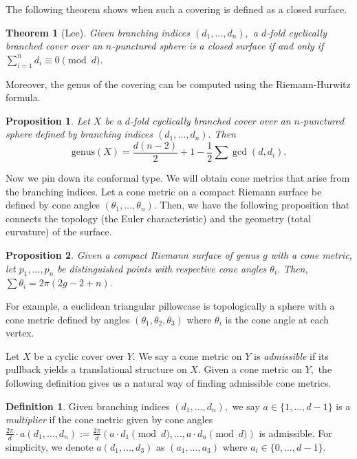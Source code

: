 \documentclass[12pt,reqno]{amsart}
\newtheorem*{thm*}{Theorem}
\newtheorem*{proposition}{Proposition}
\theoremstyle{definition}
\newtheorem{defn}{Definition}
\theoremstyle{remark}
\begin{document}
The following theorem shows when such a covering is defined as a closed surface. 

\begin{thm*} [Lee] Given branching indices $(d_1, \ldots , d_n),$ a $d$-fold cyclically branched cover over an $n$-punctured sphere is a closed surface if and only if $\sum\limits_{i=1}^n d_i \equiv 0 \pmod d.$ 
\end{thm*}

Moreover, the genus of the covering can be computed using the Riemann-Hurwitz formula.

\begin{proposition}
Let $X$ be a $d$-fold cyclically branched cover over an $n$-punctured sphere defined by branching indices $(d_1, \ldots , d_n).$ Then $$\textrm{genus}(X) = \frac{d (n - 2)}{2} + 1 - \frac{1}{2} \sum \gcd(d, d_i).$$ 
\end{proposition}

Now we pin down its conformal type. We will obtain cone metrics that arise from the branching indices. Let a cone metric on a compact Riemann surface be defined by cone angles $(\theta_1, \ldots , \theta_n).$ Then, we have the following proposition that connects the topology (the Euler characteristic) and the geometry (total curvature) of the surface. 

\begin{proposition}
Given a compact Riemann surface of genus $g$ with a cone metric, let $p_1, \ldots , p_n$ be distinguished points with respective cone angles $\theta_i.$ Then, $\sum \theta_i = 2 \pi (2 g - 2 + n).$
\end{proposition}

For example, a euclidean triangular pillowcase is topologically a sphere with a cone metric defined by angles $(\theta_1, \theta_2, \theta_3)$ where $\theta_i$ is the cone angle at each vertex. 

Let $X$ be a cyclic cover over $Y.$ We say a cone metric on $Y$ is \textit{admissible} if its pullback yields a translational structure on $X.$ Given a cone metric on $Y,$ the following definition gives us a natural way of finding admissible cone metrics. 

\begin{defn} Given branching indices $(d_1, \ldots , d_n),$ we say $a \in \{1, \ldots, d - 1\}$ is a \textit{multiplier} if the cone metric given by cone angles $\frac{2 \pi}{d} \cdot a (d_1, \ldots , d_n) := \frac{2 \pi}{d} (a \cdot d_1 \pmod d, \ldots , a \cdot d_n \pmod d)$ is admissible. For simplicity, we denote $a (d_1,\ldots , d_3)$ as $(a_1, \ldots , a_3)$ where $a_i \in \{0, \ldots , d - 1\}.$ \end{defn}
\end{document}
